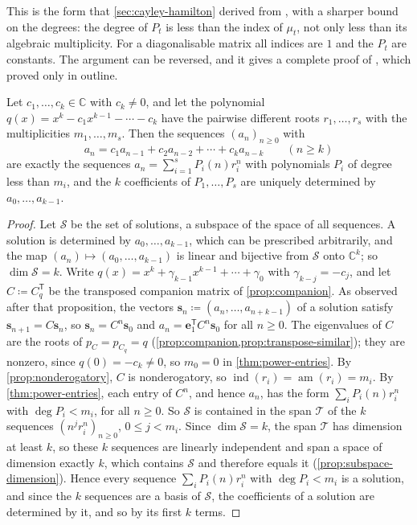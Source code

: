 This is the form that \cref{sec:cayley-hamilton} derived from , with a sharper bound on the degrees: the degree of $P_t$ is less than the index of $\mu_t$, not only less than its algebraic multiplicity. For a diagonalisable matrix all indices are $1$ and the $P_t$ are constants. The argument can be reversed, and it gives a complete proof of , which  proved only in outline.

\begin{corollary}
\label{cor:linear-recurrence}
Let $c_1,\ldots,c_k\in\mathbb C$ with $c_k\ne0$, and let the polynomial $q(x)=x^k-c_1x^{k-1}-\cdots-c_k$ have the pairwise different roots $r_1,\ldots,r_s$ with the multiplicities $m_1,\ldots,m_s$. Then the sequences $(a_n)_{n\ge0}$ with
\[
a_n=c_1a_{n-1}+c_2a_{n-2}+\cdots+c_ka_{n-k}\qquad(n\ge k)
\]
are exactly the sequences $a_n=\sum_{i=1}^sP_i(n)r_i^n$ with polynomials $P_i$ of degree less than $m_i$, and the $k$ coefficients of $P_1,\ldots,P_s$ are uniquely determined by $a_0,\ldots,a_{k-1}$.
\end{corollary}

\begin{proof}
Let $\mathcal S$ be the set of solutions, a subspace of the space of all sequences. A solution is determined by $a_0,\ldots,a_{k-1}$, which can be prescribed arbitrarily, and the map $(a_n)\mapsto(a_0,\ldots,a_{k-1})$ is linear and bijective from $\mathcal S$ onto $\mathbb C^k$; so $\dim\mathcal S=k$. Write $q(x)=x^k+\gamma_{k-1}x^{k-1}+\cdots+\gamma_0$ with $\gamma_{k-j}=-c_j$, and let $C\coloneqq C_q^{\mathsf T}$ be the transposed companion matrix of \cref{prop:companion}. As observed after that proposition, the vectors $\mathbf s_n\coloneqq(a_n,\ldots,a_{n+k-1})$ of a solution satisfy $\mathbf s_{n+1}=C\mathbf s_n$, so $\mathbf s_n=C^n\mathbf s_0$ and $a_n=\mathbf e_1^{\mathsf T}C^n\mathbf s_0$ for all $n\ge0$. The eigenvalues of $C$ are the roots of $p_C=p_{C_q}=q$ (\cref{prop:companion,prop:transpose-similar}); they are nonzero, since $q(0)=-c_k\ne0$, so $m_0=0$ in \cref{thm:power-entries}. By \cref{prop:nonderogatory}, $C$ is nonderogatory, so $\operatorname{ind}(r_i)=\operatorname{am}(r_i)=m_i$. By \cref{thm:power-entries}, each entry of $C^n$, and hence $a_n$, has the form $\sum_iP_i(n)r_i^n$ with $\deg P_i<m_i$, for all $n\ge0$. So $\mathcal S$ is contained in the span $\mathcal T$ of the $k$ sequences $(n^jr_i^n)_{n\ge0}$, $0\le j<m_i$. Since $\dim\mathcal S=k$, the span $\mathcal T$ has dimension at least $k$, so these $k$ sequences are linearly independent and span a space of dimension exactly $k$, which contains $\mathcal S$ and therefore equals it (\cref{prop:subspace-dimension}). Hence every sequence $\sum_iP_i(n)r_i^n$ with $\deg P_i<m_i$ is a solution, and since the $k$ sequences are a basis of $\mathcal S$, the coefficients of a solution are determined by it, and so by its first $k$ terms.
\end{proof}

